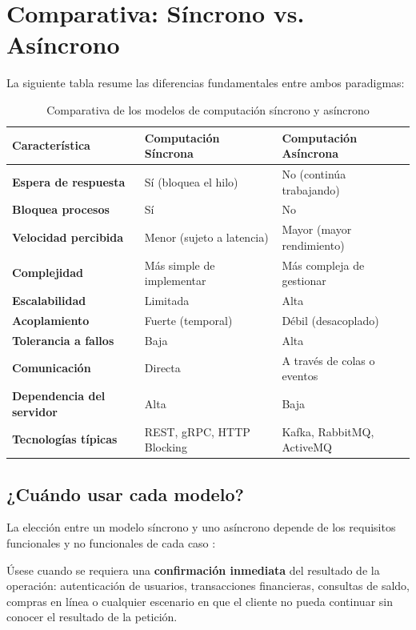 \documentclass[12pt,a4paper]{article}
\begin{document}
\section{Comparativa: Síncrono vs. Asíncrono}
 
La siguiente tabla resume las diferencias fundamentales entre ambos paradigmas:
 
\begin{table}[H]
\centering
\caption{Comparativa de los modelos de computación síncrono y asíncrono}
\label{tab:comparativa}
\renewcommand{\arraystretch}{1.4}
\begin{tabularx}{\textwidth}{|>{\bfseries}X|X|X|}
\hline
\textbf{Característica} & \textbf{Computación Síncrona} & \textbf{Computación Asíncrona} \\
\hline
Espera de respuesta & Sí (bloquea el hilo) & No (continúa trabajando) \\
\hline
Bloquea procesos & Sí & No \\
\hline
Velocidad percibida & Menor (sujeto a latencia) & Mayor (mayor rendimiento) \\
\hline
Complejidad & Más simple de implementar & Más compleja de gestionar \\
\hline
Escalabilidad & Limitada & Alta \\
\hline
Acoplamiento & Fuerte (temporal) & Débil (desacoplado) \\
\hline
Tolerancia a fallos & Baja & Alta \\
\hline
Comunicación & Directa & A través de colas o eventos \\
\hline
Dependencia del servidor & Alta & Baja \\
\hline
Tecnologías típicas & REST, gRPC, HTTP Blocking & Kafka, RabbitMQ, ActiveMQ \\
\hline
\end{tabularx}
\end{table}
 
\subsection{¿Cuándo usar cada modelo?}
 
La elección entre un modelo síncrono y uno asíncrono depende de los requisitos funcionales y no funcionales de cada caso \cite{ref14}:
 
\begin{infobox}
Úsese cuando se requiera una \textbf{confirmación inmediata} del resultado de la operación: autenticación de usuarios, transacciones financieras, consultas de saldo, compras en línea o cualquier escenario en que el cliente no pueda continuar sin conocer el resultado de la petición.
\end{infobox}
 
\end{document}
